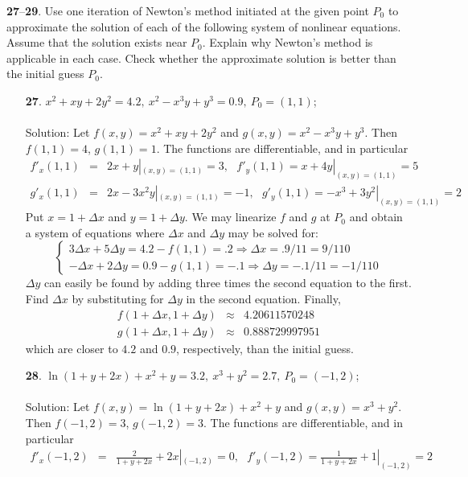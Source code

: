 \documentclass[12pt]{amsbook}
\begin{document}
\noindent
{\small {\bf 27}--{\bf 29}}. Use one iteration of Newton’s method initiated at the given point
$P_0$ to approximate the solution of each of the following system of nonlinear equations. Assume that the solution exists near $P_0$. Explain why Newton’s
method is applicable in each case. Check whether the approximate solution is better than the initial guess $P_0$.
\begin{enumerate}
\item[{\small\bf 27}.] $x^2+xy+2y^2=4.2, \ x^2-x^3y+y^3=0.9, \ P_0=(1,1)$;
\\
\\
{\sc Solution}: Let $f(x,y)=x^2+xy+2y^2$ and $g(x,y)=x^2-x^3y+y^3$. Then $f(1,1)=4$, $g(1,1)=1$. The functions are differentiable, and in particular
\begin{eqnarray*}
f'_x(1,1)&=&2x+y|_{(x,y)=(1,1)}=3, \ \ \ f'_y(1,1)=x+4y|_{(x,y)=(1,1)}=5 \\
g'_x(1,1)&=&2x-3x^2y|_{(x,y)=(1,1)}=-1, \ \ \ g'_y(1,1)=-x^3+3y^2|_{(x,y)=(1,1)}=2 
\end{eqnarray*}
Put $x=1+\Delta x$ and $y=1+\Delta y$. We may linearize $f$ and $g$ at $P_0$ and obtain a system of equations where $\Delta x$ and $\Delta y$ may be solved for:
\\
$$\begin{cases}
3\Delta x+5\Delta y = 4.2-f(1,1)=.2  \Rightarrow \Delta x=.9/11=9/110 \\
-\Delta x + 2\Delta y=0.9-g(1,1)=-.1 \Rightarrow \Delta y=-.1/11=-1/110
\end{cases}$$
$\Delta y$ can easily be found by adding three times the second equation to the first. Find $\Delta x$ by substituting for $\Delta y$ in the second equation. Finally,
\begin{eqnarray*}
f(1+\Delta x, 1+\Delta y) &\approx & 4.20611570248 \\
g(1+\Delta x, 1+\Delta y) &\approx & 0.888729997951
\end{eqnarray*}
which are closer to $4.2$ and $0.9$, respectively, than the initial guess.
\\
\item[{\small\bf 28}.] $\ln(1+y+2x)+x^2+y=3.2, \ x^3+y^2=2.7, \ P_0=(-1,2)$;
\\
\\
{\sc Solution}: Let $f(x,y)=\ln(1+y+2x)+x^2+y$ and $g(x,y)=x^3+y^2$. Then $f(-1,2)=3$, $g(-1,2)=3$. The functions are differentiable, and in particular
\begin{eqnarray*}
f'_x(-1,2)&=&\frac{2}{1+y+2x}+2x|_{(-1,2)}=0, \ \ \ f'_y(-1,2)=\frac{1}{1+y+2x}+1|_{(-1,2)}=2 \\

\end{eqnarray*}
\end{enumerate}
\end{document}
